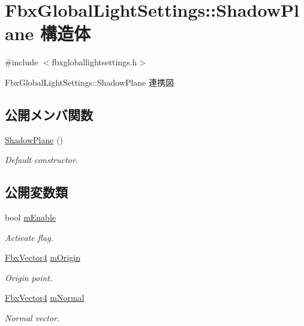 \hypertarget{struct_fbx_global_light_settings_1_1_shadow_plane}{}\section{Fbx\+Global\+Light\+Settings\+:\+:Shadow\+Plane 構造体}
\label{struct_fbx_global_light_settings_1_1_shadow_plane}


{\ttfamily \#include $<$fbxgloballightsettings.\+h$>$}



Fbx\+Global\+Light\+Settings\+:\+:Shadow\+Plane 連携図
\subsection*{公開メンバ関数}
\begin{DoxyCompactItemize}
\item 
\hyperlink{struct_fbx_global_light_settings_1_1_shadow_plane_a1bca8105fa3d43f4ac22480cc68833cc}{Shadow\+Plane} ()
\begin{DoxyCompactList}\small\item\em Default constructor. \end{DoxyCompactList}\end{DoxyCompactItemize}
\subsection*{公開変数類}
\begin{DoxyCompactItemize}
\item 
bool \hyperlink{struct_fbx_global_light_settings_1_1_shadow_plane_a1587089f4329de3c417738e5cf12513d}{m\+Enable}
\begin{DoxyCompactList}\small\item\em Activate flag. \end{DoxyCompactList}\item 
\hyperlink{class_fbx_vector4}{Fbx\+Vector4} \hyperlink{struct_fbx_global_light_settings_1_1_shadow_plane_aab22ea42cde196c6aebce68258f76fd4}{m\+Origin}
\begin{DoxyCompactList}\small\item\em Origin point. \end{DoxyCompactList}\item 
\hyperlink{class_fbx_vector4}{Fbx\+Vector4} \hyperlink{struct_fbx_global_light_settings_1_1_shadow_plane_af68d57885d38ed6679a04bea2e663a33}{m\+Normal}
\begin{DoxyCompactList}\small\item\em Normal vector. \end{DoxyCompactList}\end{DoxyCompactItemize}


